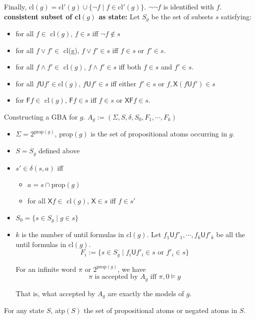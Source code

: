\documentclass[12pt]{article}
\begin{document}
\begin{CJK*}{GBK}{song}
Finally, cl$(g)=$cl$'(g)\cup \{\neg f\mid f\in\mbox{cl}'(g)\}$.  $\neg\neg f$ is identified with $f$. \\

\noindent
{\bf consistent subset of cl$(g)$ as state:} Let $S_g$ be the set of subsets $s$ satisfying:
\begin{itemize}
\item for all $f\in$ cl$(g)$, $f\in s$ iff $\neg f\not\in s$
\item for all $f\vee f'\in $ cl(g), $f\vee f'\in s$ iff $f\in s$ or $f'\in s$.
\item for all $f\wedge f'\in$ cl$(g)$, $f\wedge f'\in s$ iff both $f\in s$ and $f'\in s$.
\item for all $f\textsf{U} f'\in\mbox{cl}(g)$, $f\textsf{U} f'\in s$ iff either $f'\in s$ or $f, \textsf{X}(f\textsf{U}f')\in s$
\item for $\textsf{F}f\in$ cl$(g)$, $\textsf{F}f\in s$ iff $f\in s$ or  $\textsf{X}\textsf{F}f\in s$.
\end{itemize}

Constructing a GBA for $g$.
$A_g:=(\Sigma, S, \delta, S_0, F_1,\cdots, F_k)$

\begin{itemize}
\item $\Sigma=2^{\text{prop}(g)}$, prop$(g)$ is the set of propositional atoms occurring in $g$.
\item $S=S_g$ defined above
\item $s'\in \delta(s,a)$ iff
  \begin{itemize}
  \item $a=s\cap \mbox{prop}(g)$
  \item for all $\textsf{X} f\in$ cl$(g)$, $\textsf{X}\in s$ iff $f\in s'$
  \end{itemize}
\item $S_0=\{s\in S_g\mid g\in s\}$

\item $k$ is the number of until formulas in cl$(g)$. Let $f_1\textsf{U} f'_1,\cdots, f_k\textsf{U} f'_k$ be all the until formulas in cl$(g)$.
$$F_i:=\{ s\in S_g\mid f_i\textsf{U}f'_i\in s \mbox{ or } f'_i\in s \}$$

For an infinite word $\pi$ or $2^{\text{prop}(g)}$, we have
%
$$\pi \mbox{ is accepted by $A_g$ iff }\pi,0\models g$$

That is, what accepted by $A_g$ are exactly the models of $g$.
\end{itemize}

\color{red}
For any state $S$, atp$(S)$ the set of propositional atoms or negated atoms in $S$.


\end{CJK*}
\end{document}
